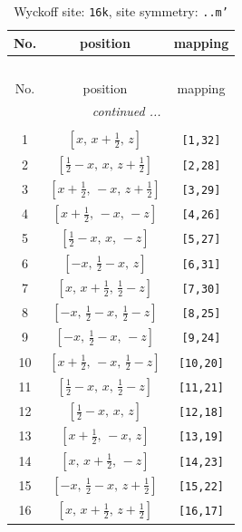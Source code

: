 \documentclass[fleqn,8pt]{jsarticle}
\begin{document}
\renewcommand{\arraystretch}{1.2}
\begin{longtable}{ccc}
\caption{Wyckoff site: {\tt 16k}, site symmetry: {\tt ..m'}}
 \\
 \hline \hline
No. & position & mapping \\ \hline \endfirsthead

\multicolumn{2}{l}{\tablename\ \thetable{}} \\
 \hline \hline
No. & position & mapping \\ \hline \endhead

 \hline \hline
\multicolumn{2}{r}{\footnotesize\it continued ...} \\ \endfoot

 \hline \hline
\multicolumn{2}{r}{} \\ \endlastfoot

1 & $\left[ x,\, x + \frac{1}{2},\, z \right]$ & {\tt [1,32]} \\ \hline
2 & $\left[ \frac{1}{2} - x,\, x,\, z + \frac{1}{2} \right]$ & {\tt [2,28]} \\ \hline
3 & $\left[ x + \frac{1}{2},\, - x,\, z + \frac{1}{2} \right]$ & {\tt [3,29]} \\ \hline
4 & $\left[ x + \frac{1}{2},\, - x,\, - z \right]$ & {\tt [4,26]} \\ \hline
5 & $\left[ \frac{1}{2} - x,\, x,\, - z \right]$ & {\tt [5,27]} \\ \hline
6 & $\left[ - x,\, \frac{1}{2} - x,\, z \right]$ & {\tt [6,31]} \\ \hline
7 & $\left[ x,\, x + \frac{1}{2},\, \frac{1}{2} - z \right]$ & {\tt [7,30]} \\ \hline
8 & $\left[ - x,\, \frac{1}{2} - x,\, \frac{1}{2} - z \right]$ & {\tt [8,25]} \\ \hline
9 & $\left[ - x,\, \frac{1}{2} - x,\, - z \right]$ & {\tt [9,24]} \\ \hline
10 & $\left[ x + \frac{1}{2},\, - x,\, \frac{1}{2} - z \right]$ & {\tt [10,20]} \\ \hline
11 & $\left[ \frac{1}{2} - x,\, x,\, \frac{1}{2} - z \right]$ & {\tt [11,21]} \\ \hline
12 & $\left[ \frac{1}{2} - x,\, x,\, z \right]$ & {\tt [12,18]} \\ \hline
13 & $\left[ x + \frac{1}{2},\, - x,\, z \right]$ & {\tt [13,19]} \\ \hline
14 & $\left[ x,\, x + \frac{1}{2},\, - z \right]$ & {\tt [14,23]} \\ \hline
15 & $\left[ - x,\, \frac{1}{2} - x,\, z + \frac{1}{2} \right]$ & {\tt [15,22]} \\ \hline
16 & $\left[ x,\, x + \frac{1}{2},\, z + \frac{1}{2} \right]$ & {\tt [16,17]} \\
\end{longtable}
\end{document}
